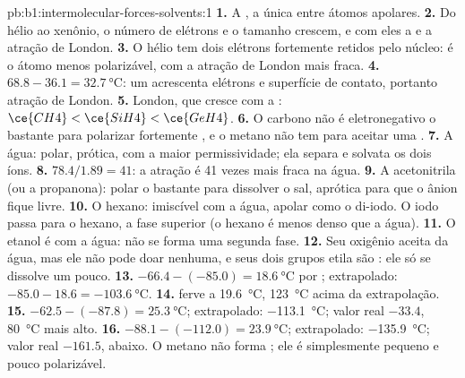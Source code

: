\begin{solution}{pb:b1:intermolecular-forces-solvents:1}
\textbf{1.} A , a única entre átomos apolares.
\textbf{2.} Do hélio ao xenônio, o número de elétrons e o tamanho
crescem, e com eles a  e a atração de London.
\textbf{3.} O hélio tem dois elétrons fortemente retidos pelo núcleo: é o
átomo menos polarizável, com a atração de London mais fraca.
\textbf{4.} $68.8 - 36.1 = \qty{32.7}{\celsius}$: um  acrescenta
elétrons e superfície de contato, portanto atração de London.
\textbf{5.} London, que cresce com a : $\ce{CH4} < \ce{SiH4} <
\ce{GeH4}$.
\textbf{6.} O carbono não é eletronegativo o bastante para polarizar
fortemente , e o metano não tem  para aceitar uma
.
\textbf{7.} A água: polar, prótica, com a maior permissividade; ela
separa e solvata os dois íons.
\textbf{8.} $78.4/1.89 = 41$: a atração é 41 vezes mais fraca na água.
\textbf{9.} A acetonitrila (ou a propanona): polar o bastante para
dissolver o sal, aprótica para que o ânion fique livre.
\textbf{10.} O hexano: imiscível com a água, apolar como o di-iodo. O iodo
passa para o hexano, a fase superior (o hexano é menos denso que a água).
\textbf{11.} O etanol é  com a água: não se forma uma segunda fase.
\textbf{12.} Seu oxigênio aceita  da água, mas ele
não pode doar nenhuma, e seus dois grupos etila são : ele só
se dissolve um pouco.
\textbf{13.} $-66.4 - (-85.0) = \qty{18.6}{\celsius}$ por ;
 extrapolado: $-85.0 - 18.6 = \qty{-103.6}{\celsius}$.
\textbf{14.}  ferve a \qty{19.6}{\celsius}, \qty{123}{\celsius}
acima da extrapolação.
\textbf{15.} $-62.5 - (-87.8) = \qty{25.3}{\celsius}$; 
extrapolado: \qty{-113.1}{\celsius}; valor real $-33.4$, \qty{80}{\celsius}
mais alto.
\textbf{16.} $-88.1 - (-112.0) = \qty{23.9}{\celsius}$; 
extrapolado: \qty{-135.9}{\celsius}; valor real $-161.5$, abaixo. O metano
não forma ; ele é simplesmente pequeno e pouco
polarizável.

\end{solution}
